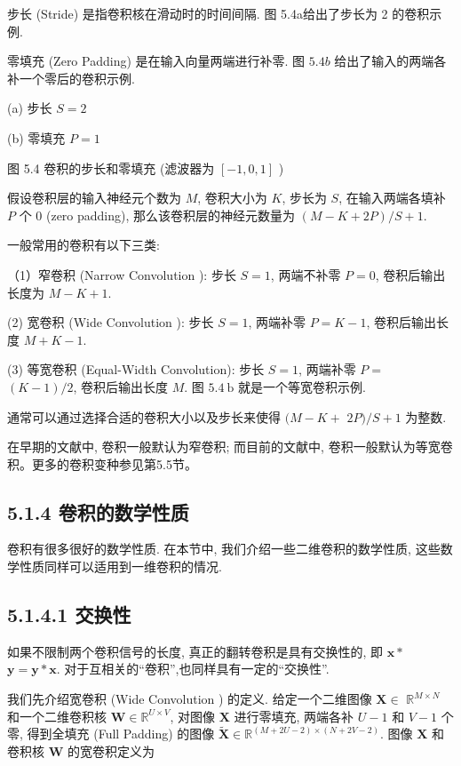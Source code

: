 \documentclass[10pt]{article}
\begin{document}
步长 (Stride) 是指卷积核在滑动时的时间间隔. 图 5.4a给出了步长为 2 的卷积示例.

零填充 (Zero Padding) 是在输入向量两端进行补零. 图 $5.4 b$ 给出了输入的两端各补一个零后的卷积示例.



(a) 步长 $S=2$



(b) 零填充 $P=1$

图 5.4 卷积的步长和零填充 (滤波器为 $[-1,0,1]$ )

假设卷积层的输入神经元个数为 $M$, 卷积大小为 $K$, 步长为 $S$, 在输入两端各填补 $P$ 个 0 (zero padding), 那么该卷积层的神经元数量为 $(M-K+2 P) / S+1$.

一般常用的卷积有以下三类:

（1）窄卷积 (Narrow Convolution ): 步长 $S=1$, 两端不补零 $P=0$, 卷积后输出长度为 $M-K+1$.

(2) 宽卷积 (Wide Convolution ): 步长 $S=1$, 两端补零 $P=K-1$, 卷积后输出长度 $M+K-1$.

(3) 等宽卷积 (Equal-Width Convolution): 步长 $S=1$, 两端补零 $P=$ $(K-1) / 2$, 卷积后输出长度 $M$. 图 $5.4 \mathrm{~b}$ 就是一个等宽卷积示例.

通常可以通过选择合适的卷积大小以及步长来使得 $(M-K+$ $2 P) / S+1$ 为整数.

在早期的文献中, 卷积一般默认为窄卷积; 而目前的文献中, 卷积一般默认为等宽卷积。更多的卷积变种参见第5.5节。

\subsection*{5.1.4 卷积的数学性质}
卷积有很多很好的数学性质. 在本节中, 我们介绍一些二维卷积的数学性质, 这些数学性质同样可以适用到一维卷积的情况.

\subsection*{5.1.4.1 交换性}
如果不限制两个卷积信号的长度, 真正的翻转卷积是具有交换性的, 即 $\boldsymbol{x} *$ $\boldsymbol{y}=\boldsymbol{y} * \boldsymbol{x}$. 对于互相关的“卷积”,也同样具有一定的“交换性”.

我们先介绍宽卷积 (Wide Convolution ) 的定义. 给定一个二维图像 $\boldsymbol{X} \in$ $\mathbb{R}^{M \times N}$ 和一个二维卷积核 $\boldsymbol{W} \in \mathbb{R}^{U \times V}$, 对图像 $\boldsymbol{X}$ 进行零填充, 两端各补 $U-1$ 和 $V-1$ 个零, 得到全填充 (Full Padding) 的图像 $\tilde{\boldsymbol{X}} \in \mathbb{R}^{(M+2 U-2) \times(N+2 V-2)}$. 图像 $\boldsymbol{X}$ 和卷积核 $\boldsymbol{W}$ 的宽卷积定义为
\end{document}
